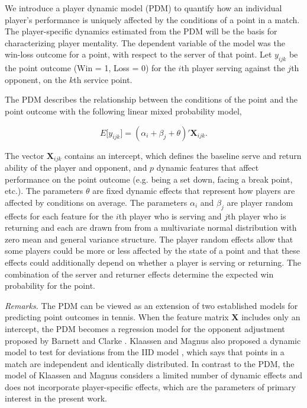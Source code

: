 \documentclass{Latex/svjour3}
\begin{document}
We introduce a player dynamic model (PDM) to quantify how an individual player's
performance is uniquely affected by the conditions of a point in a match. The
player-specific dynamics estimated from the PDM will be the basis for
characterizing player mentality. The dependent variable of the model was the
win-loss outcome for a point, with respect to the server of that point. Let
$y_{ijk}$ be the point outcome (Win = 1, Loss = 0) for the $i$th player serving
against the $j$th opponent, on the $k$th service point.

The PDM describes the relationship between the conditions of the point and the
point outcome with the following linear mixed probability model,

\begin{equation}
E\lbrack y_{ijk} \rbrack = (\alpha_{i} + \beta_{j} + \theta)' \mathbf{X}_{ijk}.
\label{eq:pdm}
\end{equation}

\noindent The vector $\mathbf{X}_{ijk}$ contains an intercept, which defines the
baseline serve and return ability of the player and opponent, and $p$ dynamic
features that affect performance on the point outcome (e.g. being a set down,
facing a break point, etc.). The parameters $\theta$ are fixed dynamic effects
that represent how players are affected by conditions 
on average. The parameters $\alpha_i$ and $\beta_j$ are player random effects
for each feature for the $i$th player who is serving and $j$th player who is
returning and each are drawn from from a multivariate normal distribution with
zero mean and general variance structure. The player random effects allow that
some players could be more or less affected by the state of a point and that
these effects could additionally depend on whether a player is serving or
returning. The combination of the server and returner effects determine the
expected win probability for the point.

\textit{Remarks.} The PDM can be viewed as an extension of two established
models for predicting point outcomes in tennis. When the feature matrix
$\mathbf{X}$ includes only an intercept, the PDM becomes a regression model for
the opponent adjustment proposed by Barnett and Clarke
. Klaassen and Magnus also proposed a
dynamic model to test for deviations from the IID model
, which says that points in a match are
independent and identically distributed. In contrast to the PDM, the model of
Klaassen and Magnus considers a limited number of dynamic effects and does not
incorporate player-specific effects, which are the parameters of primary
interest in the present work.
\end{document}
